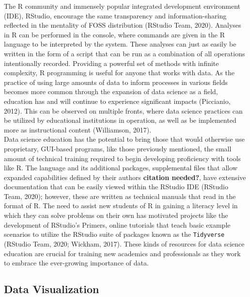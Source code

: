 \documentclass[english,man,floatsintext]{apa6}
\begin{document}
The R community and immensely popular integrated development environment (IDE), RStudio, encourage the same transparency and information-sharing reflected in the mentality of FOSS distribution (RStudio Team, 2020). Analyses in R can be performed in the console, where commands are given in the R language to be interpreted by the system. These analyses can just as easily be written in the form of a script that can be run as a combination of all operations intentionally recorded. Providing a powerful set of methods with infinite complexity, R programming is useful for anyone that works with data. As the practice of using large amounts of data to inform processes in various fields becomes more common through the expansion of data science as a field, education has and will continue to experience significant impacts (Piccianio, 2012). This can be observed on multiple fronts, where data science practices can be utilized by educational institutions in operation, as well as be implemented more as instructional content (Williamson, 2017).\\
Data science education has the potential to bring those that would otherwise use proprietary, GUI-based programs, like those previously mentioned, the small amount of technical training required to begin developing proficiency with tools like R. The language and its additional packages, supplemental files that allow expanded capabilities defined by their authors \textbf{citation needed?}, have extensive documentation that can be easily viewed within the RStudio IDE (RStudio Team, 2020); however, these are written as technical manuals that read in the format of R. The need to assist new students of R in gaining a literacy level in which they can solve problems on their own has motivated projects like the development of RStudio's Primers, online tutorials that teach basic example scenarios to utilize the RStudio suite of packages known as the \texttt{Tidyverse} (RStudio Team, 2020; Wickham, 2017). These kinds of resources for data science education are crucial for training new academics and professionals as they work to embrace the ever-growing importance of data.

\hypertarget{data-visualization}{%
\subsection{Data Visualization}\label{data-visualization}}
\end{document}
